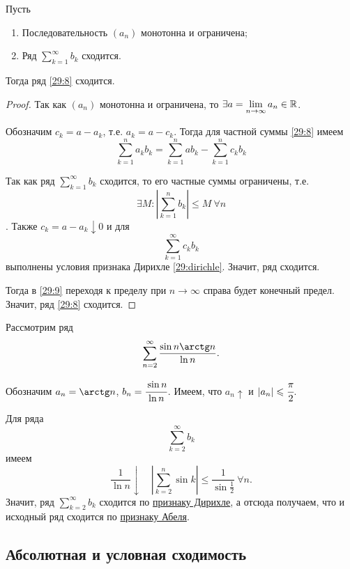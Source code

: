 \documentclass[../../main.tex]{subfiles}
\begin{document}
	\begin{thm}
		Пусть
		\begin{enumerate}
			\item Последовательность $(a_n)$ монотонна и ограничена;
			\item Ряд $\sum\limits_{k = 1}^\infty b_k$ сходится.
		\end{enumerate}
	
		Тогда ряд \eqref{29:8} сходится.
	\end{thm}
	\begin{proof}
		Так как $(a_n)$ монотонна и ограничена, то $\exists a = \lim\limits_{n\to\infty} a_n\in \mathbb{R}$.
		
		Обозначим $c_k = a - a_k$, т.е. $a_k = a - c_k$. Тогда для частной суммы \eqref{29:8} имеем
		\begin{equation}
			\sum_{k = 1}^n a_kb_k = \sum_{k = 1}^n ab_k - \sum_{k = 1}^n c_kb_k
			\label{29:9}
		\end{equation}
		
		Так как ряд $\sum\limits_{k = 1}^\infty b_k$ сходится, то его частные суммы ограничены, т.е. \[\exists M\colon \left|\sum\limits_{k = 1}^n b_k\right|\leqslant M \ \forall n\]. Также $c_k = a - a_k \downarrow 0$ и для 
		\[\sum_{k = 1}^\infty c_kb_k\]
		выполнены условия признака Дирихле \ref{29:dirichle}. Значит, ряд сходится.
		
		Тогда в \eqref{29:9} переходя к пределу при $n\to\infty$ справа будет конечный предел. Значит, ряд \eqref{29:8} сходится.
	\end{proof}
	\begin{example}
		Рассмотрим ряд
		\[\sum_{n = 2}^\infty\frac{\sin n\arctg n}{\ln n}.\]
		
		Обозначим $a_n = \arctg n$, $b_n = \cfrac{\sin n}{\ln n}$. Имеем, что $a_n\uparrow$ и $|a_n|\leqslant \cfrac{\pi}{2}$.
		
		Для ряда \[\sum_{k = 2}^\infty b_k\] имеем
		\[\frac{1}{\ln n}\downarrow\quad \left|\sum_{k = 2}^n \sin k\right|\leqslant \frac{1}{\sin\frac{1}{2}}\ \forall n.\]
		Значит, ряд $\sum\limits_{k = 2}^\infty b_k$ сходится по \href{29:dirichle}{признаку Дирихле}, а отсюда получаем, что и исходный ряд сходится по \href{29:abel}{признаку Абеля}.
	\end{example}

	\subsection{Абсолютная и условная сходимость}
	
\end{document}
